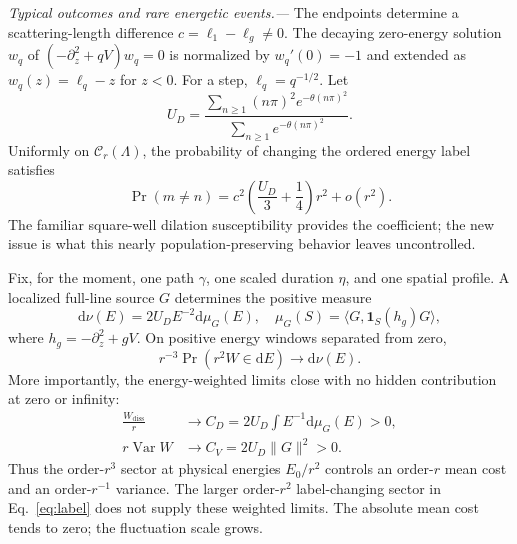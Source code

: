 \documentclass[aps,prl,reprint,superscriptaddress,longbibliography]{revtex4-2}
\newcommand{\Var}{\operatorname{Var}}
\newcommand{\Wd}{W_{\mathrm{diss}}}
\newcommand{\dd}{\mathrm{d}}
\begin{document}
\emph{Typical outcomes and rare energetic events.---}
The endpoints determine a scattering-length difference $c=\ell_1-\ell_g\ne0$. The decaying zero-energy solution $w_q$ of $(-\partial_z^2+qV)w_q=0$ is normalized by $w_q'(0)=-1$ and extended as $w_q(z)=\ell_q-z$ for $z<0$. For a step, $\ell_q=q^{-1/2}$. Let
\begin{equation}
 U_D=\frac{\sum_{n\ge1}(n\pi)^2e^{-\theta(n\pi)^2}}
 {\sum_{n\ge1}e^{-\theta(n\pi)^2}}.
 \label{eq:ud}
\end{equation}
Uniformly on $\mathcal C_r(\Lambda)$, the probability of changing the ordered energy label satisfies
\begin{equation}
 \Pr(m\ne n)=c^2\left(\frac{U_D}{3}+\frac14\right)r^2+o(r^2).
 \label{eq:label}
\end{equation}
The familiar square-well dilation susceptibility \cite{Pizio} provides the coefficient; the new issue is what this nearly population-preserving behavior leaves uncontrolled.

Fix, for the moment, one path $\gamma$, one scaled duration $\eta$, and one spatial profile. A localized full-line source $G$ determines the positive measure
\begin{equation}
 \dd\nu(E)=2U_D E^{-2}\dd\mu_G(E),\quad
 \mu_G(S)=\langle G,\mathbf1_S(h_g)G\rangle,
 \label{eq:nu}
\end{equation}
where $h_g=-\partial_z^2+gV$. On positive energy windows separated from zero,
\begin{equation}
 r^{-3}\Pr(r^2W\in\dd E)\longrightarrow\dd\nu(E).
 \label{eq:rare}
\end{equation}
More importantly, the energy-weighted limits close with no hidden contribution at zero or infinity:
\begin{align}
 \frac{\Wd}{r}&\longrightarrow C_D=2U_D\int E^{-1}\dd\mu_G(E)>0,\label{eq:mean}\\
 r\Var W&\longrightarrow C_V=2U_D\|G\|^2>0.\label{eq:variance}
\end{align}
Thus the order-$r^3$ sector at physical energies $E_0/r^2$ controls an order-$r$ mean cost and an order-$r^{-1}$ variance. The larger order-$r^2$ label-changing sector in Eq.~\eqref{eq:label} does not supply these weighted limits. The absolute mean cost tends to zero; the fluctuation scale grows.
\end{document}
